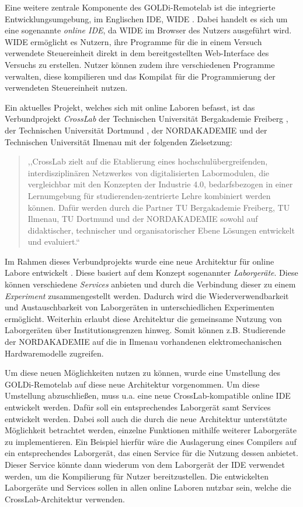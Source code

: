 Eine weitere zentrale Komponente des GOLDi-Remotelab ist die integrierte Entwicklungsumgebung, im Englischen \ac{IDE}, \ac{WIDE} \cite{henke_hidden_2021}. Dabei handelt es sich um eine sogenannte \textit{online IDE}, da WIDE im Browser des Nutzers ausgeführt wird. WIDE ermöglicht es Nutzern, ihre Programme für die in einem Versuch verwendete Steuereinheit direkt in dem bereitgestellten Web-Interface des Versuchs zu erstellen. Nutzer können zudem ihre verschiedenen Programme verwalten, diese kompilieren und das Kompilat für die Programmierung der verwendeten Steuereinheit nutzen.

Ein aktuelles Projekt, welches sich mit online Laboren befasst, ist das Verbundprojekt \textit{CrossLab} \cite{aubel_adaptable_2022} der Technischen Universität Bergakademie Freiberg \cite{noauthor_tu-freiberg_nodate}, der Technischen Universität Dortmund \cite{dortmund_tu-dortmund_nodate}, der NORDAKADEMIE \cite{noauthor_nordakademie_nodate} und der Technischen Universität Ilmenau mit der folgenden Zielsetzung:

\begin{quote}
    ,,CrossLab zielt auf die Etablierung eines hochschulübergreifenden, interdisziplinären Netzwerkes von digitalisierten Labormodulen, die vergleichbar mit den Konzepten der Industrie 4.0, bedarfsbezogen in einer Lernumgebung für studierenden-zentrierte Lehre kombiniert werden können. Dafür werden durch die Partner TU Bergakademie Freiberg, TU Ilmenau, TU Dortmund und der NORDAKADEMIE sowohl auf didaktischer, technischer und organisatorischer Ebene Lösungen entwickelt und evaluiert.`` \cite{noauthor_crosslab_nodate}
\end{quote}

Im Rahmen dieses Verbundprojekts wurde eine neue Architektur für online Labore entwickelt \cite{nau_new_2022}. Diese basiert auf dem Konzept sogenannter \textit{Laborgeräte}. Diese können verschiedene \textit{Services} anbieten und durch die Verbindung dieser zu einem \textit{Experiment} zusammengestellt werden. Dadurch wird die Wiederverwendbarkeit und Austauschbarkeit von Laborgeräten in unterschiedlichen Experimenten ermöglicht. Weiterhin erlaubt diese Architektur die gemeinsame Nutzung von Laborgeräten über Institutionsgrenzen hinweg. Somit können z.B. Studierende der NORDAKADEMIE auf die in Ilmenau vorhandenen elektromechanischen Hardwaremodelle zugreifen.

Um diese neuen Möglichkeiten nutzen zu können, wurde eine Umstellung des GOLDi-Remotelab auf diese neue Architektur vorgenommen. Um diese Umstellung abzuschließen, muss u.a. eine neue CrossLab-kompatible online IDE entwickelt werden. Dafür soll ein entsprechendes Laborgerät samt Services entwickelt werden. Dabei soll auch die durch die neue Architektur unterstützte Möglichkeit betrachtet werden, einzelne Funktionen mithilfe weiterer Laborgeräte zu implementieren. Ein Beispiel hierfür wäre die Auslagerung eines Compilers auf ein entsprechendes Laborgerät, das einen Service für die Nutzung dessen anbietet. Dieser Service könnte dann wiederum von dem Laborgerät der IDE verwendet werden, um die Kompilierung für Nutzer bereitzustellen. Die entwickelten Laborgeräte und Services sollen in allen online Laboren nutzbar sein, welche die CrossLab-Architektur verwenden.


